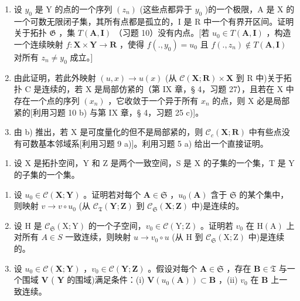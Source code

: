 \begin{enumerate}
\def\labelenumi{\alph{enumi})}
\item
  设 \(y_0\) 是 Y 的点的一个序列 \((z_n)\) (这些点都异于 \(y_0\) )的一个极限，A 是 X 的一个可数无限闭子集，其所有点都是孤立的，I 是 R 中一个有界开区间。证明关于拓扑 \(\mathfrak{G}\) ，集 \(T(\mathbf{A}, \mathbf{I})\) （习题 10）没有内点。{[}若 \(u_0 \in T(\mathbf{A}, \mathbf{I})\) ，构造一个连续映射 \(f: \mathbf{X} \times \mathbf{Y} \to \mathbf{R}\) ，使得 \(f(., y_0) = u_0\) 且 \(f(., z_n) \notin T(\mathbf{A}, \mathbf{I})\) 对所有 \(z_n \neq y_0\) 成立。{]}
\item
  由此证明，若此外映射 \((u, x) \to u(x)\) (从 \(\mathcal{C}(\mathbf{X}; \mathbf{R}) \times \mathbf{X}\) 到 R 中)关于拓扑 C 是连续的，若 X 是局部仿紧的（第 IX 章，§ 4，习题 27），且若在 X 中存在一个点的序列 \((x_{n})\) ，它收敛于一个异于所有 \(x_{n}\) 的点，则 X 必是局部紧的{[}利用习题 10 b) 与第 IX 章，§ 4，习题 25 c){]}。
\item
  由 b) 推出，若 X 是可度量化的但不是局部紧的，则 \(\mathcal{C}_{c}(\mathbf{X};\mathbf{R})\) 中有些点没有可数基本邻域系{[}利用习题 9 a){]}。利用习题 5 a) 给出一个直接证明。
\end{enumerate}

\begin{enumerate}
\def\labelenumi{\arabic{enumi})}
\setcounter{enumi}{11}
\tightlist
\item
  设 X 是拓扑空间，Y 和 Z 是两个一致空间，S 是 X 的子集的一个集，T 是 Y 的子集的一个集。
\end{enumerate}

\begin{enumerate}
\def\labelenumi{\alph{enumi})}
\item
  设 \(u_0 \in \mathcal{C}(\mathbf{X}; \mathbf{Y})\) 。证明若对每个 \(\mathbf{A} \in \mathfrak{S}\) ，\(u_0(\mathbf{A})\) 含于 \(\mathfrak{S}\) 的某个集中，则映射 \(v \to v \circ u_0\) (从 \(\mathcal{C}_{\mathfrak{T}}(\mathbf{Y}; \mathbf{Z})\) 到 \(\mathcal{C}_{\mathfrak{S}}(\mathbf{X}; \mathbf{Z})\) 中)是连续的。
\item
  设 H 是 \(\mathcal{C}_{\mathfrak{S}}(\mathrm{X};\mathrm{Y})\) 的一个子空间，\(v_{0}\in\mathcal{C}(\mathrm{Y};\mathrm{Z})\) 。证明若 \(v_{0}\) 在 \(\mathrm{H}(\mathrm{A})\) 上对所有 \(A\in S\) 一致连续，则映射 \(u\to v_{0}\circ u\) (从 H 到 \(\mathcal{C}_{\mathfrak{S}}(\mathrm{X};\mathrm{Z})\) 中)是连续的。
\item
  设 \(u_0 \in \mathcal{C}(\mathbf{X}; \mathbf{Y})\) ，\(v_0 \in \mathcal{C}(\mathbf{Y}; \mathbf{Z})\) 。假设对每个 \(\mathbf{A} \in \mathfrak{S}\) ，存在 \(\mathbf{B} \in \mathfrak{T}\) 与一个围域 \(\mathbf{V}\) ( \(\mathbf{Y}\) 的围域)满足条件：(i) \(\mathbf{V}(u_0(\mathbf{A})) \subset \mathbf{B}\) ，(ii) \(v_0\) 在 \(\mathbf{B}\) 上一致连续。
\end{enumerate}

